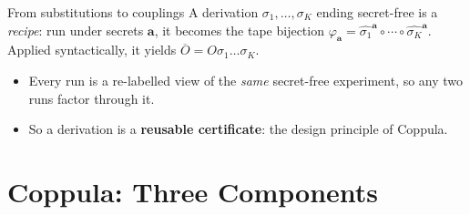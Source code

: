 \documentclass[aspectratio=169,10pt]{beamer}
\newcommand{\toolname}{Coppula}
\newcommand{\va}{\mathbf{a}}
\newcommand{\vb}{\mathbf{b}}
\begin{document}
\begin{frame}{From substitutions to couplings}
  \small
  A derivation $\sigma_1, \dots, \sigma_K$ ending secret-free is a
  \emph{recipe}: run under secrets $\va$, it becomes the tape bijection
  $\varphi_{\va} = \widehat{\sigma_1}^{\va} \circ \cdots \circ
  \widehat{\sigma_K}^{\va}$. Applied syntactically, it yields $\overline{O} = O\sigma_1\dots\sigma_K$.
  \begin{center}
  \end{center}
  \begin{itemize}
    \item<2-> Every run is a re-labelled view of the \emph{same} secret-free
      experiment, so any two runs factor through it.
    \item<3-> So a derivation is a \textbf{reusable certificate}: the design
    principle of \toolname.
  \end{itemize}
\end{frame}

\section{\toolname: Three Components}
\end{document}
